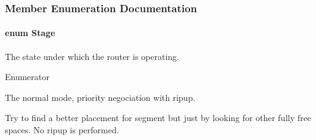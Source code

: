 \subsubsection{Member Enumeration Documentation}
\hypertarget{classKite_1_1NegociateWindow_aca8133200c1122e29b87b314d82604eb}{
\paragraph[{Stage}]{\setlength{\rightskip}{0pt plus 5cm}enum {\bf Stage}}}\label{classKite_1_1NegociateWindow_aca8133200c1122e29b87b314d82604eb}
The state under which the router is operating. \begin{Desc}
\item[Enumerator]\par
\begin{description}
\item[{\em 
\hypertarget{classKite_1_1NegociateWindow_aca8133200c1122e29b87b314d82604eba19ccda3133337a5db697480ebfd6097f}{Negociation}\label{classKite_1_1NegociateWindow_aca8133200c1122e29b87b314d82604eba19ccda3133337a5db697480ebfd6097f}
}]The normal mode, priority negociation with ripup. \item[{\em 
\hypertarget{classKite_1_1NegociateWindow_aca8133200c1122e29b87b314d82604ebabdd3263d9492edf336ac52b4a9776b82}{Packing}\label{classKite_1_1NegociateWindow_aca8133200c1122e29b87b314d82604ebabdd3263d9492edf336ac52b4a9776b82}
}]Try to find a better placement for segment but just by looking for other fully free spaces. No ripup is performed. \end{description}
\end{Desc}


